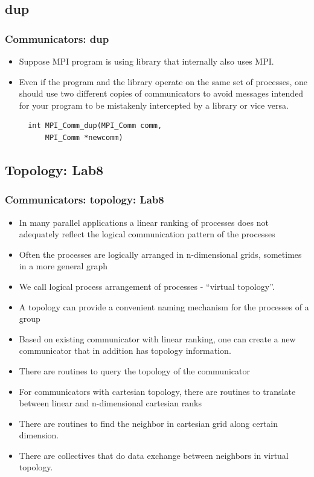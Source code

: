 \documentclass{beamer}
\begin{document}
\subsection{dup}
\begin{frame}[fragile]
  \frametitle{Communicators: dup}
\begin{itemize}
\item Suppose MPI program is using library that internally also uses MPI. 
\item Even if the program and the library operate on the same set of processes, one should use two different copies of communicators to avoid messages 
intended for your program to be mistakenly intercepted by a library or vice versa.
{\color{mycolorcode}
\begin{verbatim}
  int MPI_Comm_dup(MPI_Comm comm, 
      MPI_Comm *newcomm)
\end{verbatim}
}
\end{itemize}
\end{frame}

\subsection{Topology: Lab8}
\begin{frame}[fragile]
  \frametitle{Communicators: topology: Lab8}
\begin{itemize}
\item  In many parallel applications
a linear ranking of processes does not adequately reflect the logical communication pattern
of the processes
\item  Often the processes are logically arranged in n-dimensional grids, sometimes in a more general graph 
\item We call logical process arrangement of processes - ``virtual topology''.
\item A topology can provide a convenient naming mechanism for the processes
of a group 
\item Based on existing communicator with linear ranking, one can create a new communicator that in addition has topology information.
\item There are routines to query the topology of the communicator
\item For communicators with cartesian topology, there are routines to translate between linear and n-dimensional cartesian ranks
\item There are routines to find the neighbor in cartesian grid along certain dimension.
\item There are collectives that do data exchange between neighbors in virtual topology.
\end{itemize}
\end{frame}
\end{document}

